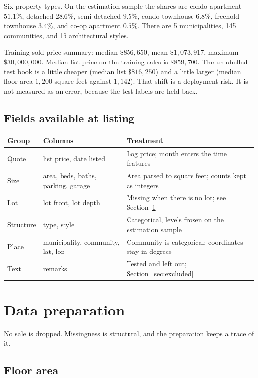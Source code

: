 \documentclass[11pt]{article}
\begin{document}
Six property types. On the estimation sample the shares are condo apartment \(51.1\%\), detached \(28.6\%\), semi-detached \(9.5\%\), condo townhouse \(6.8\%\), freehold townhouse \(3.4\%\), and co-op apartment \(0.5\%\). There are 5 municipalities, 145 communities, and 16 architectural styles.

Training sold-price summary: median \(\$856{,}650\), mean \(\$1{,}073{,}917\), maximum \(\$30{,}000{,}000\). Median list price on the training sales is \(\$859{,}700\). The unlabelled test book is a little cheaper (median list \(\$816{,}250\)) and a little larger (median floor area \(1{,}200\) square feet against \(1{,}142\)). That shift is a deployment risk. It is not measured as an error, because the test labels are held back.

\subsection{Fields available at listing}

\begin{center}
\small
\begin{tabular}{llp{6.6cm}}
\toprule
Group & Columns & Treatment \\
\midrule
Quote & list price, date listed & Log price; month enters the time features \\
Size & area, beds, baths, parking, garage & Area parsed to square feet; counts kept as integers \\
Lot & lot front, lot depth & Missing when there is no lot; see Section~\ref{sec:clean} \\
Structure & type, style & Categorical, levels frozen on the estimation sample \\
Place & municipality, community, lat, lon & Community is categorical; coordinates stay in degrees \\
Text & remarks & Tested and left out; Section~\ref{sec:excluded} \\
\bottomrule
\end{tabular}
\end{center}

\section{Data preparation}
\label{sec:clean}

No sale is dropped. Missingness is structural, and the preparation keeps a trace of it.

\subsection{Floor area}
\end{document}
